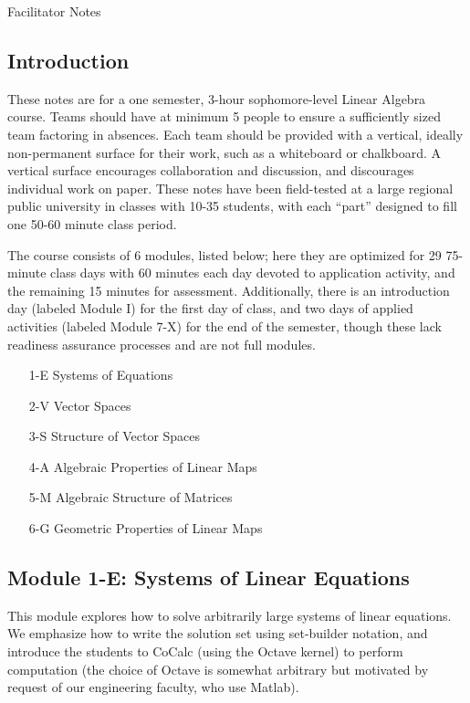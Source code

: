 \documentclass{article}
\begin{document}
\begin{center}
{\Large Facilitator Notes}
\end{center}

\subsection*{Introduction}

These notes are for a one semester, 3-hour sophomore-level Linear Algebra course.  Teams should have at minimum 5 people to ensure a sufficiently sized team factoring in absences.  Each team should be provided with a vertical, ideally non-permanent surface for their work, such as a whiteboard or chalkboard.  A vertical surface encourages collaboration and discussion, and discourages individual work on paper.  These notes have been field-tested at a large regional public university in classes with 10-35 students, with each ``part'' designed to fill one 50-60 minute class period.

The course consists of 6 modules, listed below; here they are optimized for 29 75-minute class days with 60 minutes each day devoted to application activity, and the remaining 15 minutes for assessment.  Additionally, there is an introduction day (labeled Module I) for the first day of class, and two days of applied activities (labeled Module 7-X) for the end of the semester, though these lack readiness assurance processes and are not full modules. 

\begin{enumerate}
\item [1-E] Systems of Equations
\item [2-V] Vector Spaces
\item [3-S] Structure of Vector Spaces
\item [4-A] Algebraic Properties of Linear Maps
\item [5-M] Algebraic Structure of Matrices
\item [6-G] Geometric Properties of Linear Maps
\end{enumerate}

\subsection*{Module 1-E: Systems of Linear Equations}
This module explores how to solve arbitrarily large systems of linear equations.  We emphasize how to write the solution set using set-builder notation, and introduce the students to CoCalc (using the Octave kernel) to perform computation (the choice of Octave is somewhat arbitrary but motivated by request of our engineering faculty, who use Matlab).  
\end{document}
